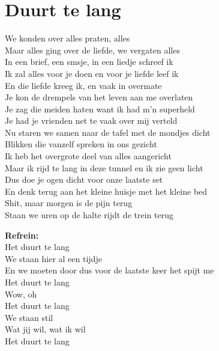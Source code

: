 \section{Duurt te lang}
We konden over alles praten, alles\\
Maar alles ging over de liefde, we vergaten alles\\
In een brief, een smsje, in een liedje schreef ik\\
Ik zal alles voor je doen en voor je liefde leef ik\\
En die liefde kreeg ik, en vaak in overmate\\
Je kon de drempels van het leven aan me overlaten\\
Je zag die meiden haten want ik had m’n superheld\\
Je had je vrienden net te vaak over mij verteld\\
Nu staren we samen naar de tafel met de mondjes dicht\\
Blikken die vanzelf spreken in ons gezicht\\
Ik heb het overgrote deel van alles aangericht\\
Maar ik rijd te lang in deze tunnel en ik zie geen licht\\
Dus doe je ogen dicht voor onze laatste set\\
En denk terug aan het kleine huisje met het kleine bed\\
Shit, maar morgen is de pijn terug\\
Staan we uren op de halte rijdt de trein terug

\textbf{Refrein:}\\
Het duurt te lang\\
We staan hier al een tijdje\\
En we moeten door dus voor de laatste keer het spijt me\\
Het duurt te lang\\
Wow, oh\\
Het duurt te lang\\
We staan stil\\
Wat jij wil, wat ik wil\\
Het duurt te lang

